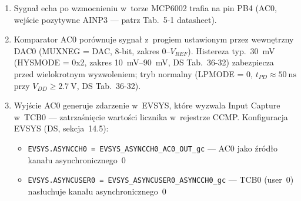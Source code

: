 \documentclass[a4paper,11pt]{article}
\begin{document}
	\begin{enumerate}[nosep]
		\item Sygnał echa po wzmocnieniu w~torze MCP6002 trafia
		na pin PB4 (AC0, wejście pozytywne AINP3 --- patrz Tab.~5-1 datasheet).
		\item Komparator AC0 porównuje sygnał z~progiem ustawionym przez
		wewnętrzny DAC0 (MUXNEG = DAC, 8-bit, zakres 0--$V_{REF}$).
		Histereza typ.\ \SI{30}{\milli\volt} (HYSMODE = 0x2,
		zakres \SIrange{10}{90}{\milli\volt}, DS Tab.~36-32) zabezpiecza
		przed wielokrotnym wyzwoleniem; tryb normalny (LPMODE = 0,
		$t_{PD} \approx \SI{50}{\nano\second}$ przy $V_{DD} \geq \SI{2,7}{\volt}$,
		DS Tab.~36-32).
		\item Wyjście AC0 generuje zdarzenie w~EVSYS, które
		wyzwala Input Capture w~TCB0 --- zatrzaśnięcie wartości licznika
		w~rejestrze CCMP. Konfiguracja EVSYS (DS, sekcja~14.5):
		\begin{itemize}[nosep]
			\item \texttt{EVSYS.ASYNCCH0 = EVSYS\_ASYNCCH0\_AC0\_OUT\_gc}
			--- AC0 jako źródło kanału asynchronicznego~0
			\item \texttt{EVSYS.ASYNCUSER0 = EVSYS\_ASYNCUSER0\_ASYNCCH0\_gc}
			--- TCB0 (user~0) nasłuchuje kanału asynchronicznego~0
		\end{itemize}
	\end{enumerate}
	
\end{document}
